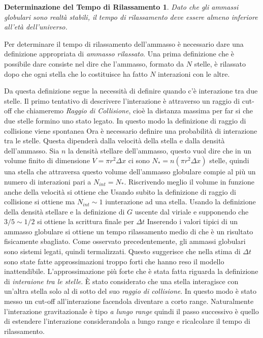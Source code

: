 \newtheorem*{mydef7}{Determinazione del Tempo di Rilassamento}
\begin{mydef7}
	Dato che gli ammassi globulari sono realt\`a stabili, il tempo di rilassamento deve essere almeno inferiore all'et\`a dell'universo.
\end{mydef7}
Per determinare il tempo di rilassamento dell'ammasso \`e necessario dare una definizione appropriata di \emph{ammasso rilassato}. Una prima definizione che \`e possibile dare consiste nel dire che l'ammasso, formato da $N$ stelle, \`e rilassato dopo che ogni stella che lo costituisce ha fatto $N$ interazioni con le altre.

Da questa definizione segue la necessit\`a di definire quando c'\`e interazione tra due stelle. 
Il primo tentativo di descrivere l'interazione \`e attraverso un raggio di cut-off che chiameremo \emph{Raggio di Collisione}, cio\`e la distanza massima per far si che due stelle formino uno stato legato. In questo modo la definizione di raggio di collisione viene spontanea
Ora \`e necessario definire una probabilit\`a di interazione tra le stelle. Questa dipender\`a dalla velocit\`a della stella e dalla densit\`a dell'ammasso. Sia $n$ la densit\`a stellare dell'ammasso, questo vuol dire che in un volume finito di dimensione $V=\pi r^2 \Delta x$ ci sono $N_{*}=n(\pi r^2 \Delta x)$ stelle, quindi una stella che attraversa questo volume dell'ammasso globulare compie al pi\`u un numero di interazioni pari a $N_{int} = N_{*}$. Riscrivendo meglio il volume in funzione anche della velocit\`a si ottiene che
Usando subito la definizione di raggio di collisione si ottiene
ma $N_{int} \sim 1$ iunterazione ad una stella. Usando la definizione della densit\`a stellare e la definizione di $G$ uscente dal viriale
e supponendo che $3/5 \sim 1/2$ si ottiene la scrittura finale per $\Delta t$
Inserendo i valori tipici di un ammasso globulare si ottiene un tempo rilassamento medio di
che \`e un risultato fisicamente sbagliato. Come osservato precedentemente, gli ammassi globulari sono sistemi legati, quindi termalizzati. Questo suggerisce che nella stima di $\Delta t$ sono state fatte approssimazioni troppo forti che hanno reso il modello inattendibile. L'approssimazione pi\`u forte che \`e stata fatta riguarda la definizione di \emph{interaione tra le stelle}. \`E stato considerato che una stella interagisce con un'altra stella solo al di sotto del suo \emph{raggio di collisione}. In questo modo \`e stato messo un cut-off all'interazione facendola diventare a corto range. Naturalmente l'interazione gravitazionale \`e tipo \emph{a lungo range} quindi il passo successivo \`e quello di estendere l'interazione considerandola a lungo range e ricalcolare il tempo di rilassamento.
